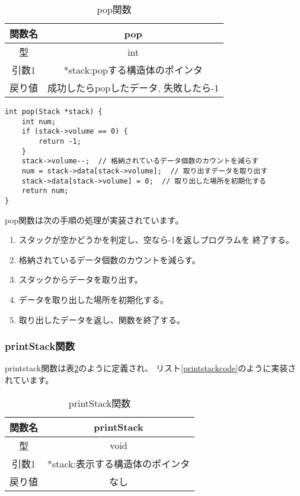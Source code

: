 \documentclass[a4j]{jarticle}
\begin{document}
\begin{table}[h]
  \centering
  \caption{pop関数}
  \label{tb:pop}
  \begin{tabular}{|c|c|}
    \hline
    関数名 & pop                    \\
    \hline
    型   & int                    \\
    \hline
    引数1 & *stack:popする構造体のポインタ   \\
    \hline
    戻り値 & 成功したらpopしたデータ, 失敗したら-1 \\
    \hline
  \end{tabular}
\end{table}

\begin{lstlisting}[caption=pop関数,label=popcode]
  int pop(Stack *stack) {
    int num;
    if (stack->volume == 0) {
        return -1;
    }
    stack->volume--;  // 格納されているデータ個数のカウントを減らす
    num = stack->data[stack->volume];  // 取り出すデータを取り出す
    stack->data[stack->volume] = 0;  // 取り出した場所を初期化する
    return num;
}
  \end{lstlisting}

pop関数は次の手順の処理が実装されています。
\begin{enumerate}
  \item スタックが空かどうかを判定し、空なら-1を返しプログラムを
        終了する。
  \item 格納されているデータ個数のカウントを減らす。
  \item スタックからデータを取り出す。
  \item データを取り出した場所を初期化する。
  \item 取り出したデータを返し、関数を終了する。
\end{enumerate}

\subsubsection{printStack関数}
printstack関数は表\ref{tb:printstack}のように定義され、
リスト\ref{printstackcode}のように実装されています。

\begin{table}[h]
  \centering
  \caption{printStack関数}
  \label{tb:printstack}
  \begin{tabular}{|c|c|}
    \hline
    関数名 & printStack          \\
    \hline
    型   & void                \\
    \hline
    引数1 & *stack:表示する構造体のポインタ \\
    \hline
    戻り値 & なし                  \\
    \hline
  \end{tabular}
\end{table}
\end{document}
